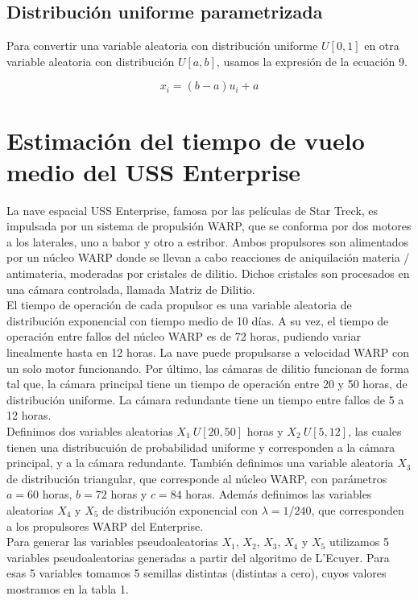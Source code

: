 \documentclass[10pt,journal,compsoc]{IEEEtran}
\begin{document}
\subsection{Distribuci\'on uniforme parametrizada}
Para convertir una variable aleatoria con distribuci\'on uniforme $U[0,1]$ en otra variable aleatoria con distribuci\'on
$U[a, b]$, usamos la expresi\'on de la ecuaci\'on 9.

\begin{equation}
 x_i = (b-a)u_i + a
\end{equation}




\section{Estimaci\'on del tiempo de vuelo medio del USS Enterprise}
La nave espacial USS Enterprise, famosa por las pel\'iculas de Star Treck, es impulsada por un sistema de propulsi\'on WARP, 
que se conforma por dos motores a los laterales, uno a babor y otro a estribor. Ambos propulsores son alimentados por un n\'ucleo WARP
donde se llevan a cabo reacciones de aniquilaci\'on materia / antimateria, moderadas por cristales de dilitio. Dichos cristales 
son procesados en una c\'amara controlada, llamada Matriz de Dilitio.\\
\indent El tiempo de operaci\'on de cada propulsor es una variable aleatoria de distribuci\'on exponencial con tiempo medio de 10 d\'ias. 
A su vez, el tiempo de operaci\'on entre fallos del n\'ucleo WARP es de 72 horas, pudiendo variar linealmente hasta en 12 horas. 
La nave puede propulsarse a velocidad WARP con un solo motor funcionando. Por \'ultimo, las c\'amaras de dilitio funcionan de forma tal que, la c\'amara principal tiene un tiempo de operaci\'on entre 
20 y 50 horas, de distribuci\'on uniforme. La c\'amara redundante tiene un tiempo entre fallos de 5 a 12 horas.\\

\indent Definimos dos variables aleatorias  $X_1~U[20,50]$ horas y $X_2~U[5, 12]$, las cuales tienen una distribucui\'on de probabilidad uniforme y corresponden a la c\'amara principal, y a la c\'amara redundante. Tambi\'en definimos una variable aleatoria $X_3$ de distribuci\'on 
triangular, que corresponde al n\'ucleo WARP, con par\'ametros $a = 60$ horas, $b = 72$ horas y $c = 84$ horas. Adem\'as
definimos las variables aleatorias $X_4$ y $X_5$ de distribuci\'on exponencial con $\lambda=1/240$, que corresponden a los propulsores WARP del Enterprise.\\
\indent Para generar las variables pseudoaleatorias $X_1$, $X_2$, $X_3$, $X_4$ y $X_5$ utilizamos 5 variables pseudoaleatorias generadas
a partir del algoritmo de L'Ecuyer.  Para esas 5 variables tomamos 5 semillas distintas (distintas a cero), cuyos valores mostramos en la tabla 1.
\end{document}
